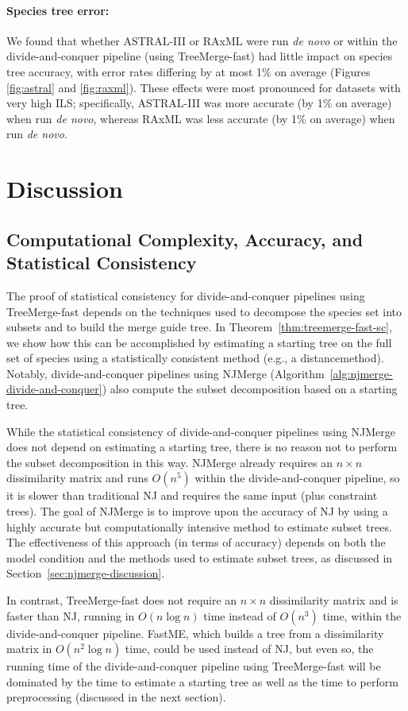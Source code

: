 \paragraph{Species tree error:}
We found that whether ASTRAL-III or RAxML were run {\em de novo} or within the divide-and-conquer pipeline (using TreeMerge-fast) had little impact on species tree accuracy, with error rates differing by at most 1\% on average (Figures \ref{fig:astral} and \ref{fig:raxml}).
These effects were most pronounced for datasets with very high ILS; specifically, ASTRAL-III was more accurate (by 1\% on average) when run {\em de novo}, whereas RAxML was less accurate (by 1\% on average) when run {\em de novo}.

\section{Discussion}
\subsection{Computational Complexity, Accuracy, and Statistical Consistency}
The proof of statistical consistency for divide-and-conquer pipelines using TreeMerge-fast depends on the techniques used to  decompose the species set into subsets and to build the merge guide tree.
In Theorem~\ref{thm:treemerge-fast-sc}, we show how this can be accomplished by estimating a starting tree on the full set of species using a statistically consistent method (e.g., a \gls{distancemethod}).
Notably, divide-and-conquer pipelines using NJMerge (Algorithm~\ref{alg:njmerge-divide-and-conquer}) also compute the subset decomposition based on a starting tree.

While the statistical consistency of divide-and-conquer pipelines using NJMerge does not depend on estimating a starting tree, there is no reason not to perform the subset decomposition in this way.
NJMerge already requires an $n \times n$ dissimilarity matrix and runs $O(n^5)$ within the divide-and-conquer pipeline, so it is slower than traditional NJ and requires the same input (plus constraint trees).
The goal of NJMerge is to improve upon the accuracy of NJ by using a highly accurate but computationally intensive method to estimate subset trees.
The effectiveness of this approach (in terms of accuracy) depends on both the model condition and the methods used to estimate subset trees, as discussed in Section~\ref{sec:njmerge-discussion}.

In contrast, TreeMerge-fast does not require an $n \times n$ dissimilarity matrix and is faster than NJ, running in $O(n \log{n})$ time instead of $O(n^3)$ time, within the divide-and-conquer pipeline. 
FastME, which builds a tree from a dissimilarity matrix in $O(n^2\log{n})$ time, could be used instead of NJ, but even so, the running time of the divide-and-conquer pipeline using TreeMerge-fast will be dominated by the time to estimate a starting tree as well as the time to perform preprocessing (discussed in the next section).

